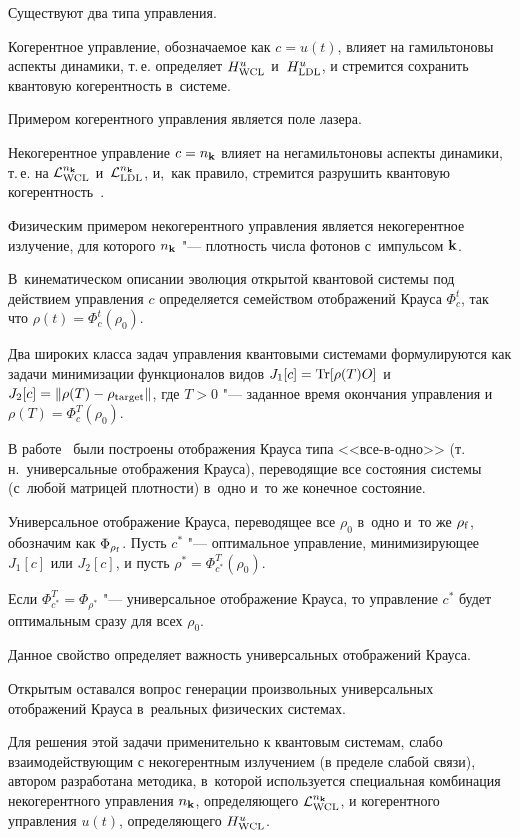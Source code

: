 Существуют два типа управления. 

Когерентное управление, обозначаемое как $c=u(t)$, влияет на гамильтоновы аспекты динамики, т.\,е. определяет $H_{\rm WCL}^u$ и~$H_{\rm LDL}^u$, и стремится сохранить квантовую когерентность в~системе. 

Примером когерентного управления является поле лазера. 

Некогерентное управление $c=n_{\bf k}$ влияет на негамильтоновы аспекты динамики, т.\,е. на ${\cal L}_{\rm WCL}^{n_{\bf k}}$ и~${\cal L}_{\rm LDL}^{n_{\bf k}}$, и,~как правило, стремится разрушить квантовую когерентность~\cite{ice1}. 

Физическим примером некогерентного управления является некогерентное излучение, для которого $n_{\bf k}$ "--- плотность числа фотонов с~импульсом ${\bf k}$. 

В~кинематическом описании эволюция открытой квантовой системы под действием управления $c$ определяется семейством отображений Крауса $\Phi^t_c$, так что $\rho(t)=\Phi^t_c(\rho_0)$. 

Два широких класса задач управления квантовыми системами формулируются как задачи минимизации функционалов видов $J_1[c]={\rm Tr}[\rho(T) O]$ и $J_2[c]=\|\rho(T)-\rho_{\rm target}\|$, где $T>0$ "--- заданное время окончания управления и~$\rho(T)=\Phi^T_c(\rho_0)$.



В работе~\cite{Wu07} были построены отображения Крауса типа <<все-в-одно>> (т.\,н.~универсальные отображения Крауса), переводящие все состояния системы (с~любой матрицей плотности) в~одно и~то же конечное состояние. 

Универсальное отображение Крауса, переводящее все $\rho_0$ в~одно и~то же $\rho_{\rm f}$, обозначим как $\Phi_{\rho_{\rm f}}$. Пусть $c^*$ "--- оптимальное управление, минимизирующее $J_1[c]$ или $J_2[c]$, и пусть $\rho^*=\Phi^T_{c^*}(\rho_0)$. 

Если $\Phi^T_{c^*}=\Phi_{\rho^*}$ "--- универсальное отображение Крауса, то управление $c^*$ будет оптимальным сразу для всех $\rho_0$. 

Данное свойство определяет важность универсальных отображений Крауса. 

Открытым оставался вопрос генерации произвольных универсальных отображений Крауса в~реальных физических системах. 

Для решения этой задачи применительно к  квантовым системам, слабо взаимодействующим с некогерентным излучением (в пределе слабой связи), автором разработана методика, в~которой используется специальная комбинация некогерентного управления $n_{\bf k}$, определяющего ${\cal L}_{\rm WCL}^{n_{\bf k}}$, и когерентного управления $u(t)$, определяющего $H_{\rm WCL}^{u}$. 

